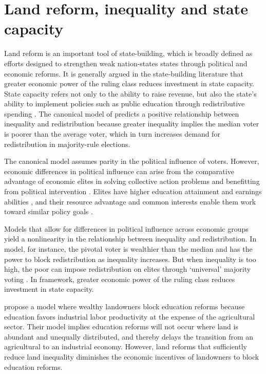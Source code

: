 \section{Land reform, inequality and state capacity}

Land reform is an important tool of state-building, which is broadly defined as efforts designed to strengthen weak nation-states states through political and economic reforms. It is generally argued in the state-building literature that greater economic power of the ruling class reduces investment in state capacity. State capacity refers not only to the ability to raise revenue, but also the state’s ability to implement policies such as public education through redistributive spending \citep{besley2010state}. The canonical model of \citet{meltzer1981rational} predicts a positive relationship between inequality and redistribution because greater inequality implies the median voter is poorer than the average voter, which in turn increases demand for redistribution in majority-rule elections. 

The canonical model assumes parity in the political influence of voters. However, economic differences in political influence can arise from the comparative advantage of economic elites in solving collective action problems and benefitting from political intervention \citep{acemoglu2008persistence}. Elites have higher education attainment and earnings abilities \citep{bourguignon2000oligarchy}, and their resource advantage and common interests enable them work toward similar policy goals \citep{winters2009}. 

Models that allow for differences in political influence across economic groups yield a nonlinearity in the relationship between inequality and redistribution. In  model, for instance, the pivotal voter is wealthier than the median and has the power to block redistribution as inequality increases. But when inequality is too high, the poor can impose redistribution on elites through `universal' majority voting \citep{perotti1993political,saint1993education}. In  framework, greater economic power of the ruling class reduces investment in state capacity. 

\citet{galor2009inequality} propose a model where wealthy landowners block education reforms because education favors industrial labor productivity at the expense of the agricultural sector. Their model implies education reforms will not occur where land is abundant and unequally distributed, and thereby delays the transition from an agricultural to an industrial economy. However, land reforms that sufficiently reduce land inequality diminishes the economic incentives of landowners to block education reforms. 
%

